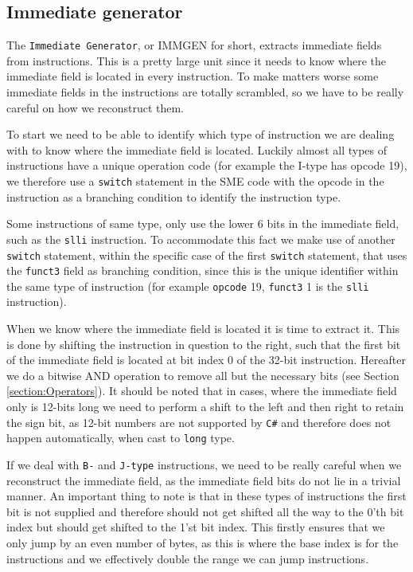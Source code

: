     
    \subsection{Immediate generator}
        The \texttt{Immediate Generator}, or IMMGEN for short, extracts immediate fields from instructions. This is a pretty large unit since it needs to know where the immediate field is located in every instruction. To make matters worse some immediate fields in the instructions are totally scrambled, so we have to be really careful on how we reconstruct them.
        
        To start we need to be able to identify which type of instruction we are dealing with to know where the immediate field is located. Luckily almost all types of instructions have a unique operation code (for example the I-type has opcode 19), we therefore use a \texttt{switch} statement in the SME code with the opcode in the instruction as a branching condition to identify the instruction type.
        
        Some instructions of same type, only use the lower 6 bits in the immediate field, such as the \texttt{slli} instruction. To accommodate this fact we make use of another \texttt{switch} statement, within the specific case of the first \texttt{switch} statement, that uses the \texttt{funct3} field as branching condition, since this is the unique identifier within the same type of instruction (for example \texttt{opcode} 19, \texttt{funct3} 1 is the \texttt{slli} instruction).
        
        When we know where the immediate field is located it is time to extract it. This is done by shifting the instruction in question to the right, such that the first bit of the immediate field is located at bit index 0 of the 32-bit instruction. Hereafter we do a bitwise AND operation to remove all but the necessary bits (see Section \ref{section:Operators}). It should be noted that in cases, where the immediate field only is 12-bits long we need to perform a shift to the left and then right to retain the sign bit, as 12-bit numbers are not supported by \texttt{C\#} and therefore does not happen automatically, when cast to \texttt{long} type.
        
        If we deal with \texttt{B-} and \texttt{J-type} instructions, we need to be really careful when we reconstruct the immediate field, as the immediate field bits do not lie in a trivial manner. An important thing to note is that in these types of instructions the first bit is not supplied and therefore should not get shifted all the way to the 0'th bit index but should get shifted to the 1'st bit index. This firstly ensures that we only jump by an even number of bytes, as this is where the base index is for the instructions and we effectively double the range we can jump instructions.
        
